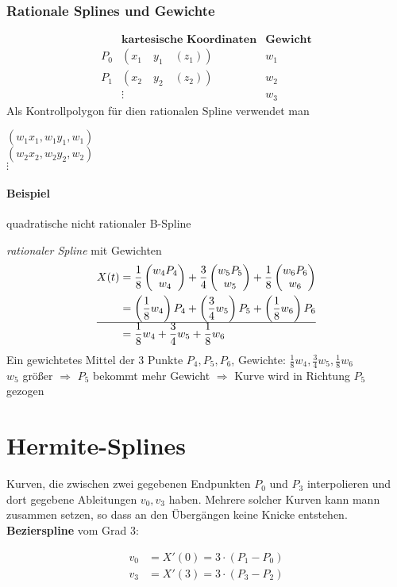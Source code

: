 \subsubsection{Rationale Splines und Gewichte}
\[
 \begin{array}{rr|l}
      & \textbf{kartesische Koordinaten} & \textbf{Gewicht}\\
  \hline
  P_0 & (x_1 \quad y_1 \quad (z_1)) & w_1\\
  P_1 & (x_2 \quad y_2 \quad (z_2)) & w_2\\
	& \vdots & w_3
 \end{array}
\]
Als Kontrollpolygon für dien rationalen Spline verwendet man
\begin{center}
 $(w_1x_1,w_1y_1,w_1)$\\
 $(w_2x_2,w_2y_2,w_2)$\\
 $\vdots$
\end{center}

\paragraph*{Beispiel} quadratische nicht rationaler B-Spline
\begin{center}
\end{center}
\emph{rationaler Spline} mit Gewichten
\begin{align*}
 X(t) &= \frac{1}{8} \begin{pmatrix}w_4 P_4\\w_4\end{pmatrix} + \frac{3}{4} \begin{pmatrix}w_5 P_5\\w_5\end{pmatrix} + \frac{1}{8} \begin{pmatrix}w_6 P_6\\w_6\end{pmatrix} \\
      &= \left(\frac{1}{8} w_4\right) P_4 + \left(\frac{3}{4} w_5\right) P_5 + \left(\frac{1}{8} w_6\right) P_6\\
      \hline
      &= \frac{1}{8} w_4 + \frac{3}{4} w_5 + \frac{1}{8} w_6
\end{align*}
Ein gewichtetes Mittel der 3 Punkte $P_4, P_5, P_6$, Gewichte: $\frac{1}{8} w_4, \frac{3}{4} w_5, \frac{1}{8} w_6$\\
$w_5$ größer $\Rightarrow$ $P_5$ bekommt mehr Gewicht $\Rightarrow$ Kurve wird in Richtung $P_5$ gezogen

\section{Hermite-Splines}
\begin{center}
\end{center}
Kurven, die zwischen zwei gegebenen Endpunkten $P_0$ und $P_3$ interpolieren und dort gegebene Ableitungen $v_0, v_3$
haben. Mehrere solcher Kurven kann mann zusammen setzen, so dass an den Übergängen keine Knicke entstehen.\\[1em]
\textbf{Bezierspline} vom Grad 3:
\begin{center}
\end{center}
\begin{align*}
 v_0 &= X'(0) = 3 \cdot (P_1 - P_0)\\
 v_3 &= X'(3) = 3 \cdot (P_3 - P_2)
\end{align*}

